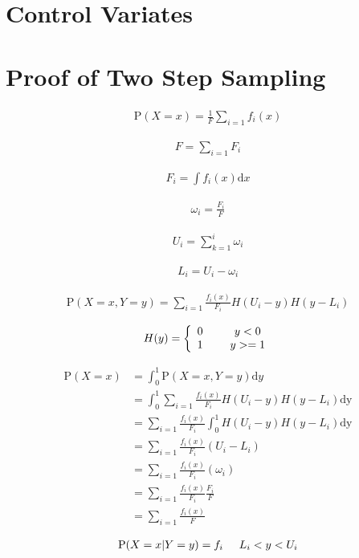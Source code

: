 \documentclass{revtex4}
\begin{document}
\section{Control Variates}

\section{Proof of Two Step Sampling}
  \begin{align}
    \mathrm{P}(X=x) = \frac{1}{F}\sum_{i=1}f_i(x)
  \end{align}

  \begin{align}
    F = \sum_{i=1} F_i
  \end{align}

  \begin{align}
    F_i = \int f_i(x) \mathrm{d}x
  \end{align}

  \begin{align}
    \omega_i = \frac{F_i}{F}
  \end{align}

  \begin{align}
    U_i = \sum_{k=1}^{i} \omega_i
  \end{align}

  \begin{align}
    L_i = U_i - \omega_i 
  \end{align}

  \begin{align}
    \mathrm{P}(X=x, Y=y) = \sum_{i=1} \frac{f_i(x)}{F_i} H(U_i - y) H(y - L_i)
  \end{align}

  \begin{align}
    H(y) = 
    \left\{ \begin{array}{cc} 
    0 & \hspace{5mm} y<0 \\
    1 & \hspace{5mm} y>=1 \\
    \end{array} \right.
  \end{align}

  \begin{align}
    \mathrm{P}(X=x) &= \int_0^1 \mathrm{P}(X=x, Y=y) \mathrm{d}y \\
    &= \int_0^1 \sum_{i=1} \frac{f_i(x)}{F_i} H(U_i - y) H(y - L_i) \mathrm{dy} \\
    &= \sum_{i=1} \frac{f_i(x)}{F_i} \int_0^1 H(U_i - y) H(y - L_i) \mathrm{dy} \\
    &= \sum_{i=1} \frac{f_i(x)}{F_i} (U_i - L_i) \\
    &= \sum_{i=1} \frac{f_i(x)}{F_i} (\omega_i) \\
    &= \sum_{i=1} \frac{f_i(x)}{F_i} \frac{F_i}{F} \\
    &= \sum_{i=1} \frac{f_i(x)}{F}
  \end{align}

  \begin{align}
    \mathrm{P}(X=x|Y=y) = f_i \hspace{5mm} L_i < y < U_i
  \end{align}
\end{document}

